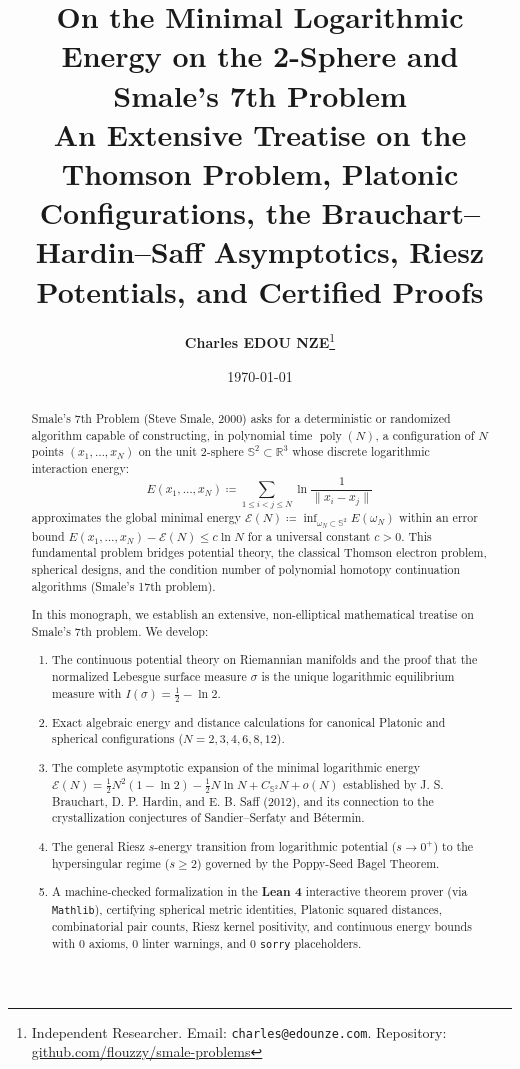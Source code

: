 \documentclass[11pt,a4paper]{article}
\title{\textbf{\Large On the Minimal Logarithmic Energy on the 2-Sphere and Smale's 7th Problem}\\[0.5em]
\large An Extensive Treatise on the Thomson Problem, Platonic Configurations, the Brauchart--Hardin--Saff Asymptotics, Riesz Potentials, and Certified Proofs}
\author{\textbf{Charles EDOU NZE}\thanks{Independent Researcher. Email: \texttt{charles@edounze.com}. Repository: \href{https://github.com/flouzzy/smale-problems}{github.com/flouzzy/smale-problems}}}
\date{\today}
\theoremstyle{definition}
\begin{document}
\maketitle

\begin{abstract}
Smale's 7th Problem (Steve Smale, 2000) asks for a deterministic or randomized algorithm capable of constructing, in polynomial time $\operatorname{poly}(N)$, a configuration of $N$ points $(x_1, \dots, x_N)$ on the unit 2-sphere $\mathbb{S}^2 \subset \mathbb{R}^3$ whose discrete logarithmic interaction energy:
\begin{equation}\label{eq:log_energy_def}
E(x_1, \dots, x_N) \coloneqq \sum_{1 \le i < j \le N} \ln \frac{1}{\|x_i - x_j\|}
\end{equation}
approximates the global minimal energy $\mathcal{E}(N) \coloneqq \inf_{\omega_N \subset \mathbb{S}^2} E(\omega_N)$ within an error bound $E(x_1, \dots, x_N) - \mathcal{E}(N) \le c \ln N$ for a universal constant $c > 0$. This fundamental problem bridges potential theory, the classical Thomson electron problem, spherical designs, and the condition number of polynomial homotopy continuation algorithms (Smale's 17th problem).

In this monograph, we establish an extensive, non-elliptical mathematical treatise on Smale's 7th problem. We develop:
\begin{enumerate}
    \item The continuous potential theory on Riemannian manifolds and the proof that the normalized Lebesgue surface measure $\sigma$ is the unique logarithmic equilibrium measure with $I(\sigma) = \frac{1}{2} - \ln 2$.
    \item Exact algebraic energy and distance calculations for canonical Platonic and spherical configurations ($N=2, 3, 4, 6, 8, 12$).
    \item The complete asymptotic expansion of the minimal logarithmic energy $\mathcal{E}(N) = \frac{1}{2} N^2 (1 - \ln 2) - \frac{1}{2} N \ln N + C_{\mathbb{S}^2} N + o(N)$ established by J. S. Brauchart, D. P. Hardin, and E. B. Saff (2012), and its connection to the crystallization conjectures of Sandier--Serfaty and B{\'e}termin.
    \item The general Riesz $s$-energy transition from logarithmic potential ($s \to 0^+$) to the hypersingular regime ($s \ge 2$) governed by the Poppy-Seed Bagel Theorem.
    \item A machine-checked formalization in the \textbf{Lean 4} interactive theorem prover (via \texttt{Mathlib}), certifying spherical metric identities, Platonic squared distances, combinatorial pair counts, Riesz kernel positivity, and continuous energy bounds with 0 axioms, 0 linter warnings, and 0 \texttt{sorry} placeholders.
\end{enumerate}
\end{abstract}
\end{document}
